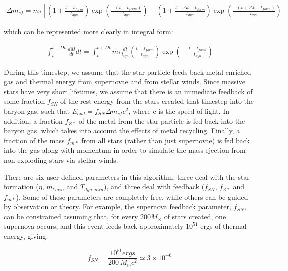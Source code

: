 \begin{eqnarray}  
\Delta m_{sf} =  m_{*} \left[ \left(1 + \frac{t-t_{form}}{t_{dyn}}  \right)
		   \exp{\left( \frac{-(t-t_{form})}{t_{dyn}} \right) }
	       - \left( 1 + \frac{t+ \Delta t-t_{form}}{t_{dyn}} \right) 
                    \exp{ \left( \frac{-(t+\Delta t-t_{form})}{t_{dyn}} \right)  }
                   \right]
\end{eqnarray}

which can be represented more clearly in integral form:

\begin{eqnarray}
\int_{t}^{t+Dt} \frac{dM}{dt} dt = \int_{t}^{t+Dt} m_{*} 
\frac{dt}{t_{tyn}} \left( \frac{t-t_{form}}{t_{dyn}} \right) 
\exp{ \left( - ~ \frac{t-t_{form}}{t_{dyn}} \right) }
\end{eqnarray}

During this timestep, we assume that the star particle feeds back
metal-enriched gas and thermal energy from supernovae and from stellar winds.
Since massive stars have very short lifetimes, we assume that there is an
immediate feedback of some fraction $f_{SN}$ of the rest energy from the
stars created that timestep into the baryon gas, such that 
$E_{add} = f_{SN} \Delta m_{sf} c^2$, where c is the speed of light.
In addition, a fraction $f_{Z*}$ of the metal from the star particle
is fed back into the baryon gas, which takes into account the effects
of metal recycling.  Finally, a fraction of the mass $f_{m*}$ from all
stars (rather than just supernovae) is fed back into the gas along with
momentum in order to simulate the mass ejection from non-exploding stars
via stellar winds.

There are six user-defined parameters in this algorithm:  three deal with the
star formation ($\eta$, $m_{*min}$ and $T_{dyn,min}$), and three 
deal with feedback ($f_{SN}$, $f_{Z*}$ and $f_{m*}$).  Some of these
parameters are completely free, while others can be guided by observation
or theory.  For example, the supernova feedback parameter, $f_{SN}$, can be 
constrained assuming that, for every $200 M_\odot$ of stars created, one
supernova occurs, and this event feeds back approximately $10^{51}$ ergs of
thermal energy, giving:

\begin{equation}
f_{SN} = \frac{10^{51} ergs}{200~M_\odot c^2} \simeq 3 \times 10^{-6}
\end{equation}

